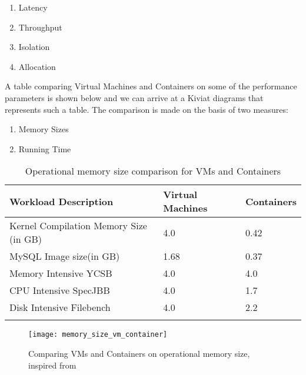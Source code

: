 \begin{enumerate}
    \item Latency
    \item Throughput
    \item Isolation
    \item Allocation
\end{enumerate}

A table comparing Virtual Machines and Containers on some of the performance parameters is shown below and we can arrive at a Kiviat diagrams that represents such a table.
The comparison is made on the basis of two measures:
\begin{enumerate}
    \item Memory Sizes
    \item Running Time
\end{enumerate}


\begin{longtable}[t!]{|p{}|p{}|p{}|}
\hline\hline
Workload Description&Virtual Machines&Containers\\
\hline\hline
\hline
Kernel Compilation Memory Size (in GB)&4.0&0.42\\
\hline
MySQL Image size(in GB)&1.68&0.37\\
\hline
Memory Intensive YCSB&4.0&4.0\\
\hline
CPU Intensive SpecJBB&4.0&1.7\\
\hline
Disk Intensive Filebench&4.0&2.2\\
\hline
\hline\hline
\label{tab:tab4}
\caption{Operational memory size comparison for VMs and Containers \cite{sharma16}}
\end{longtable}




\begin{figure}[h!]
    \centering
    \texttt{[image: memory\_size\_vm\_container]}
    \label{fig:12}
    \caption{Comparing VMs and Containers on operational memory size, inspired from \protect\cite{mach17}}
\end{figure}

